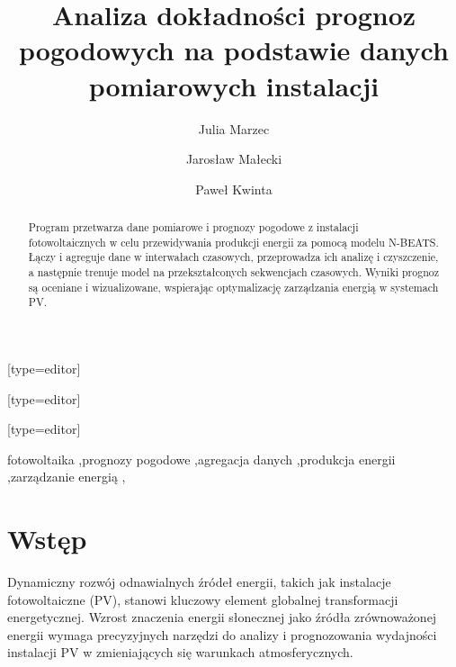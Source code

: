 \documentclass[a4paper,fleqn,final]{cas-dc}\usepackage[authoryear,longnamesfirst]{natbib}
\begin{document}
\let\WriteBookmarks\relax
\def\floatpagepagefraction{1}
\def\textpagefraction{.001}



\title [mode = title]{Analiza dokładności prognoz pogodowych na podstawie danych pomiarowych instalacji}                      

\author[1]{Julia Marzec}[type=editor]
\author[2]{Jarosław Małecki}[type=editor]
\author[3]{Paweł Kwinta}[type=editor]
\cormark[1]
\address[1]{Wydział Elektrotechniki, Automatyki i Informatyki, Politechnika Opolska, Opole, Polska }



\begin{abstract}
Program przetwarza dane pomiarowe i prognozy pogodowe z instalacji fotowoltaicznych w celu przewidywania produkcji energii za pomocą modelu N-BEATS. Łączy i agreguje dane w interwałach czasowych, przeprowadza ich analizę i czyszczenie, a następnie trenuje model na przekształconych sekwencjach czasowych. Wyniki prognoz są oceniane i wizualizowane, wspierając optymalizację zarządzania energią w systemach PV.
\end{abstract}

\begin{keywords}
fotowoltaika \sep prognozy pogodowe  \sep agregacja danych \sep produkcja energii \sep zarządzanie energią \sep 
\end{keywords}

\maketitle

\section{Wstęp}

Dynamiczny rozwój odnawialnych źródeł energii, takich jak instalacje fotowoltaiczne (PV), stanowi kluczowy element globalnej transformacji energetycznej. Wzrost znaczenia energii słonecznej jako źródła zrównoważonej energii wymaga precyzyjnych narzędzi do analizy i prognozowania wydajności instalacji PV w zmieniających się warunkach atmosferycznych. 
\end{document}
